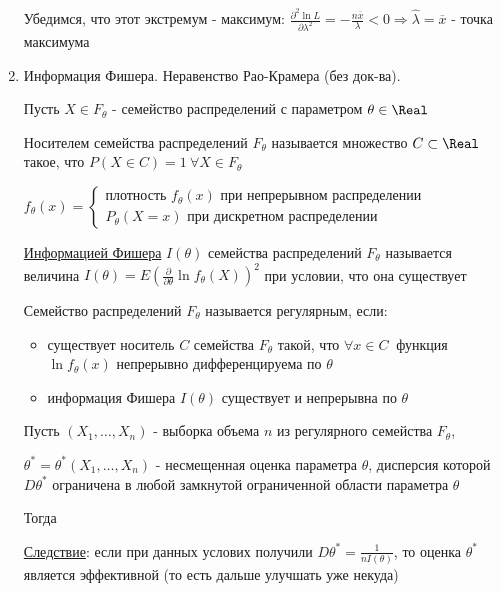 \begin{enumerate}
    Убедимся, что этот экстремум - максимум: $\frac{\partial^2 \ln L}{\partial \lambda^2} = -\frac{n \overline{x}}{\lambda} < 0 \Longrightarrow \hat{\lambda} = \overline{x}$ - точка максимума
    
    \item Информация Фишера. Неравенство Рао-Крамера (без док-ва).

    Пусть $X \in F_\theta$ - семейство распределений с параметром $\theta \in \Real$

    \Def Носителем семейства распределений $F_\theta$ называется множество $C \subset \Real$
    такое, что $P(X \in C) = 1 \ \forall X \in F_\theta$

    $f_\theta(x) = \begin{cases}
        \text{плотность } f_\theta(x) \text{ при непрерывном распределении} \\
        P_\theta(X = x) \text{ при дискретном распределении}
    \end{cases}$

    \Def \hyperlink{fishers_information}{Информацией Фишера} $I(\theta)$ семейства распределений $F_\theta$ называется величина 
    $I(\theta) = E\left(\frac{\partial}{\partial \theta} \ln f_\theta(X)\right)^2$ при условии, что
    она существует

    \Def Семейство распределений $F_\theta$ называется регулярным, если:

    \begin{itemize}
        \item существует носитель $C$ семейства $F_\theta$ такой, что $\forall x \in C \ $ функция $\ln f_\theta(x)$ непрерывно дифференцируема по $\theta$
        \item информация Фишера $I(\theta)$ существует и непрерывна по $\theta$
    \end{itemize}

    \begin{MyTheorem}
         Пусть $(X_1, \dots, X_n)$ - выборка объема $n$ из регулярного семейства $F_\theta$,

        $\theta^* = \theta^*(X_1, \dots, X_n)$ - несмещенная оценка параметра $\theta$, дисперсия которой
        $D\theta^*$ ограничена в любой замкнутой ограниченной области параметра $\theta$

        Тогда 
    \end{MyTheorem}

    \underline{Следствие}: если при данных услових получили $D\theta^* = \frac{1}{n I(\theta)}$, то оценка $\theta^*$ является эффективной 
    (то есть дальше улучшать уже некуда)


\end{enumerate}
